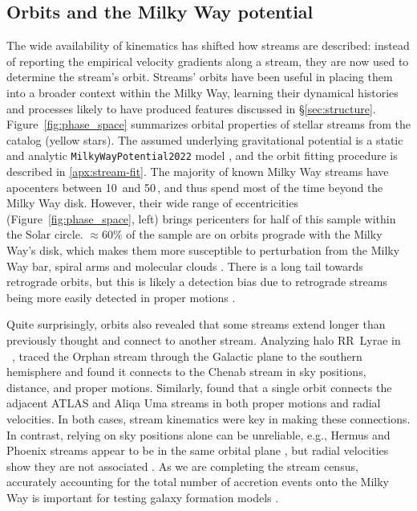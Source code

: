 \documentclass[final,5p,times,twocolumn,authoryear]{elsarticle}
\begin{document}
\subsection{Orbits and the Milky Way potential}
The wide availability of kinematics has shifted how streams are described: instead of reporting the empirical velocity gradients along a stream, they are now used to determine the stream's orbit.
Streams' orbits have been useful in placing them into a broader context within the Milky Way, learning their dynamical histories and processes likely to have produced features discussed in \S\ref{sec:structure}.
Figure~\ref{fig:phase_space} summarizes orbital properties of stellar streams from the \citet{ibata:2023} catalog (yellow stars).
The assumed underlying gravitational potential is a static and analytic \texttt{MilkyWayPotential2022} model \citep{price-whelan:2017}, and the orbit fitting procedure is described in \ref{apx:stream-fit}.
The majority of known Milky Way streams have apocenters between 10\,\unit{\kpc} and 50\,\unit{\kpc}, and thus spend most of the time beyond the Milky Way disk.
However, their wide range of eccentricities (Figure~\ref{fig:phase_space}, left) brings pericenters for half of this sample within the Solar circle.
$\approx60\%$ of the sample are on orbits prograde with the Milky Way's disk, which makes them more susceptible to perturbation from the Milky Way bar, spiral arms and molecular clouds \citep[e.g.,][]{pearson:2017, banik:2019}.
There is a long tail towards retrograde orbits, but this is likely a detection bias due to retrograde streams being more easily detected in proper motions \citep[e.g.,][]{ibata:2021}.

Quite surprisingly, orbits also revealed that some streams extend longer than previously thought and connect to another stream.
Analyzing halo RR~Lyrae in \gaia~, \citet{koposov:2019} traced the Orphan stream through the Galactic plane to the southern hemisphere and found it connects to the Chenab stream in sky positions, distance, and proper motions.
Similarly, \citet{li:2021} found that a single orbit connects the adjacent ATLAS and Aliqa Uma streams in both proper motions and radial velocities.
In both cases, stream kinematics were key in making these connections.
In contrast, relying on sky positions alone can be unreliable, e.g., Hermus and Phoenix streams appear to be in the same orbital plane \citep{grillmair:2016b}, but radial velocities show they are not associated \citep{martin:2018}.
As we are completing the stream census, accurately accounting for the total number of accretion events onto the Milky Way is important for testing galaxy formation models \citep{pillepich:2015, shipp:2023, wright:2023, khoperskov:2023}.
\end{document}
